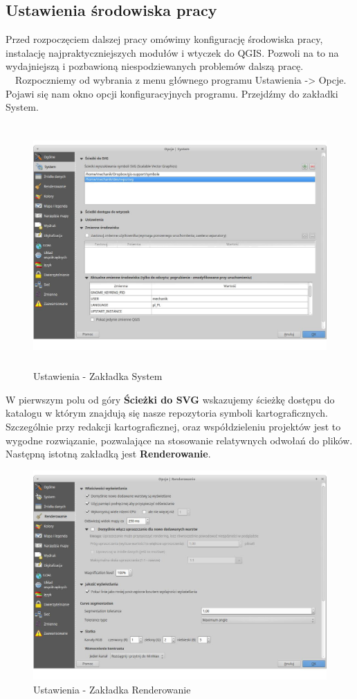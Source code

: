 \documentclass[12pt,a4paper]{book}
\begin{document}
\subsection{Ustawienia środowiska pracy}
Przed rozpoczęciem dalszej pracy omówimy konfigurację środowiska pracy, instalację najpraktyczniejszych modułów i wtyczek do QGIS. Pozwoli na to na wydajniejszą i pozbawioną niespodziewanych problemów dalszą pracę.
\ \ Rozpoczniemy od wybrania z menu głównego programu Ustawienia -{\textgreater} Opcje. Pojawi się nam okno opcji konfiguracyjnych programu. Przejdźmy do zakładki System. 
\begin{figure}[!ht]
	\centering
	\includegraphics[width=13.014cm,height=9.282cm]{002-zakladka-system.png}
	\caption{Ustawienia - Zakładka System}
\end{figure}
W pierwszym polu od góry \textbf{Ścieżki do SVG }wskazujemy ścieżkę dostępu do katalogu w którym znajdują się nasze repozytoria symboli kartograficznych. Szczególnie przy redakcji kartograficznej, oraz współdzieleniu projektów jest to wygodne rozwiązanie, pozwalające na stosowanie relatywnych odwołań do plików. Następną istotną zakładką jest \textbf{Renderowanie}.
\begin{figure}[!ht]
	\centering
	\includegraphics[scale=0.4]{002-zakladka-renderowanie.jpg}
	\caption{Ustawienia - Zakładka Renderowanie}
\end{figure}
\end{document}
